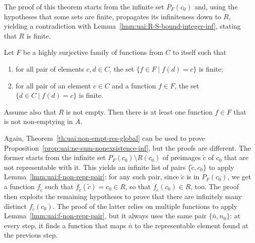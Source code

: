 The proof of this theorem starts from the infinite set $P_F(c_0)$ and, using the hypotheses that some sets are finite, propagates its infiniteness down to $R$, yielding a contradiction with Lemma~\ref{lmm:uai:R-S-bound-integer-inf}, stating that $R$ is finite.
\begin{theorem}\label{th:uai:non-empt-res-global}
	Let $F$ be a highly surjective family of functions  from $C$ to itself such that
	\begin{enumerate}
		\item for all pair of elements $c, d \in C$, the set $\{ f \in F \mid f(d) = c \}$ is finite;
		\item for all pair of an element $c \in C$ and a function $f \in F$, the set $\{ d \in C \mid f(d) = c \}$ is finite.
	\end{enumerate}
	Assume also that $R$ is not empty. Then there is at least one function $f \in F$ that is not non-emptying in $A$.
\end{theorem}

\begin{remark}
	Again, Theorem~\ref{th:uai:non-empt-res-global} can be used to prove Proposition~\ref{prop:uai:ne-sum-nonexsistence-inf}, but the proofs are different.
	The former starts from the infinite set $P_F(c_0) \setminus R(c_0)$ of preimages $\tilde{c}$ of $c_0$ that are not representable with it. This yields an infinite list of pairs $\{ \tilde{c}, c_0 \}$ to apply Lemma~\ref{lmm:uai:f-non-repr-pair}: for any such pair, since $\tilde{c}$ is in $P_F(c_0)$, we get a function $f_{\tilde{c}}$ such that $f_{\tilde{c}}(\tilde{c}) = c_0 \in R$, so that $f_{\tilde{c}}(c_0) \in R$, too. The proof then exploits the remaining hypotheses to prove that there are infinitely many distinct $f_{\tilde{c}}(c_0)$.
	The proof of the latter relies on multiple functions to apply Lemma~\ref{lmm:uai:f-non-repr-pair}, but it always uses the same pair $\{ \bar{n}, n_0 \}$: at every step, it finds a function that maps $\bar{n}$ to the representable element found at the previous step.
\end{remark}

